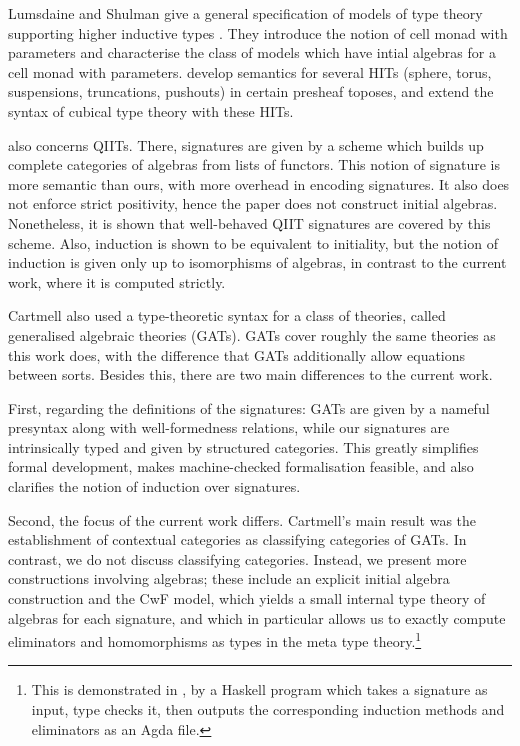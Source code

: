 \documentclass[acmsmall,screen]{acmart}
\begin{document}
Lumsdaine and Shulman give a general specification of
models of type theory supporting higher inductive types
\cite{lumsdaineShulman}. They introduce the notion of cell monad with
parameters and characterise the class of models which have intial
algebras for a cell monad with parameters. \cite{cubicalhits} develop
semantics for several HITs (sphere, torus, suspensions, truncations,
pushouts) in certain presheaf toposes, and extend the syntax of
cubical type theory \cite{ctt} with these HITs.

\cite{altenkirch2018quotient} also concerns QIITs. There, signatures
are given by a scheme which builds up complete categories of algebras
from lists of functors. This notion of signature is more semantic than
ours, with more overhead in encoding signatures. It also does not
enforce strict positivity, hence the paper does not construct initial algebras.
Nonetheless, it is shown that well-behaved QIIT signatures
are covered by this scheme. Also, induction is shown to be equivalent
to initiality, but the notion of induction is given only up to
isomorphisms of algebras, in contrast to the current work, where it is
computed strictly.

Cartmell \cite{gat} also used a type-theoretic syntax for a class of
theories, called generalised algebraic theories (GATs). GATs cover
roughly the same theories as this work does, with the difference that
GATs additionally allow equations between sorts. Besides this, there
are two main differences to the current work.

First, regarding the definitions of the signatures: GATs are given by
a nameful presyntax along with well-formedness relations, while our
signatures are intrinsically typed and given by structured
categories. This greatly simplifies formal development, makes
machine-checked formalisation feasible, and also clarifies the notion
of induction over signatures.

Second, the focus of the current work differs. Cartmell's main result
was the establishment of contextual categories as classifying
categories of GATs. In contrast, we do not discuss classifying
categories. Instead,
we present more constructions involving algebras; these include an
explicit initial algebra construction and the CwF model, which yields
a small internal type theory of algebras for each signature, and which
in particular allows us to exactly compute eliminators and
homomorphisms as types in the meta type theory.\footnote{This is
demonstrated in \cite{kaposi_et_al:LIPIcs:2018:9190}, by a Haskell program which
takes a signature as input, type checks it, then outputs the
corresponding induction methods and eliminators as an Agda file.}
\end{document}
